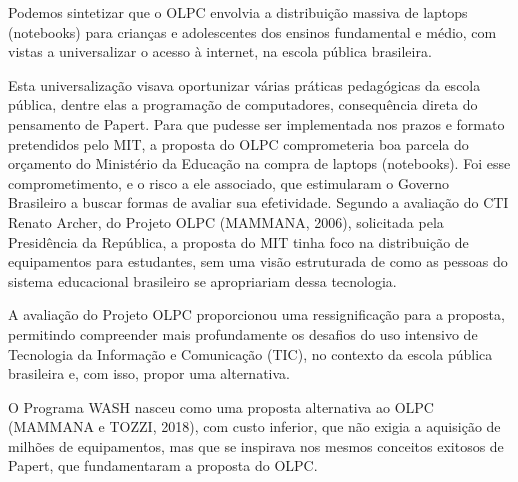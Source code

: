 \documentclass[
12pt,		%
openright,	%
twoside,  %
a4paper,			%
chapter=TITLE,		%
english,			%
french,				%
spanish,			%
brazil				%
]{USPSC-classe/USPSC}
\begin{document}
Podemos sintetizar que o OLPC envolvia a distribui\c{c}\~ao massiva de laptops (notebooks) para crian\c{c}as e adolescentes dos ensinos fundamental e m\'edio, com vistas a universalizar o acesso \`a internet, na escola p\'ublica brasileira.









Esta universaliza\c{c}\~ao visava oportunizar v\'arias pr\'aticas pedag\'ogicas da escola p\'ublica, dentre elas a programa\c{c}\~ao de computadores, consequ\^encia direta do pensamento de Papert. Para que pudesse ser implementada nos prazos e formato pretendidos pelo MIT, a proposta do OLPC comprometeria boa parcela do or\c{c}amento do Minist\'erio da Educa\c{c}\~ao na compra de laptops (notebooks). Foi esse comprometimento, e o risco a ele associado, que estimularam o Governo Brasileiro a buscar formas de avaliar sua efetividade. Segundo a avalia\c{c}\~ao do CTI Renato Archer, do Projeto OLPC  (MAMMANA, 2006), solicitada pela Presid\^encia da Rep\'ublica, a proposta do MIT tinha foco na distribui\c{c}\~ao de equipamentos para estudantes, sem uma vis\~ao estruturada de como as pessoas do sistema educacional brasileiro se apropriariam dessa tecnologia.









A avalia\c{c}\~ao do Projeto OLPC proporcionou uma ressignifica\c{c}\~ao para a proposta, permitindo compreender mais profundamente os desafios do uso intensivo de Tecnologia da Informa\c{c}\~ao e Comunica\c{c}\~ao (TIC), no contexto da escola p\'ublica brasileira e, com isso, propor uma alternativa.









O Programa WASH nasceu como uma proposta alternativa ao OLPC (MAMMANA e TOZZI, 2018), com custo inferior, que n\~ao exigia a aquisi\c{c}\~ao de milh\~oes de equipamentos, mas que se inspirava nos mesmos conceitos exitosos de Papert, que fundamentaram a proposta do OLPC.
\end{document}
